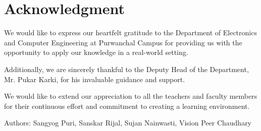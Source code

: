 \chapter*{Acknowledgment}

We would like to express our heartfelt gratitude to the Department of Electronics and Computer Engineering at Purwanchal Campus for providing us with the opportunity to apply our knowledge in a real-world setting.

Additionally, we are sincerely thankful to the Deputy Head of the Department, Mr. Pukar Karki, for his invaluable guidance and support.

We would like to extend our appreciation to all the teachers and faculty members for their continuous effort and commitment to creating a learning environment.

\vspace{1cm}
Authors: Sangyog Puri, Sanskar Rijal, Sujan Nainwasti, Vision Peer Chaudhary